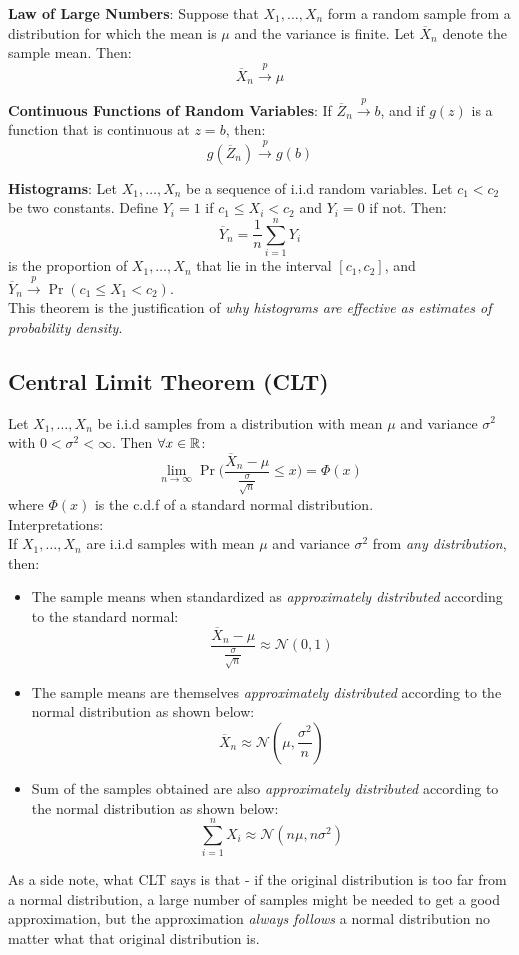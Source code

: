 \documentclass[english, 11pt]{article}
\begin{document}
{\bf Law of Large Numbers}:  Suppose that $X_1, \ldots, X_n$ form a random sample from a distribution for which the mean is $\mu$ and the variance is finite. Let $\overline{X}_n$ denote the sample mean. Then:
\[ \overline{X}_n \xrightarrow{p} \mu \]

{\bf Continuous Functions of Random Variables}: If $\overline{Z}_n \xrightarrow{p} b$, and if $g(z)$ is a function that is continuous at $z=b$, then:
\[ g(\overline{Z}_n) \xrightarrow{p} g(b) \]

{\bf Histograms}: Let $X_1, \ldots, X_n$ be a sequence of i.i.d random variables. Let $c_1 < c_2$ be two constants. Define $Y_i = 1$ if $c_1 \le X_i < c_2$ and $Y_i = 0$ if not. Then:
\[ \overline{Y}_n = \frac{1}{n} \sum_{i=1}^n Y_i \] is the proportion of $X_1, \ldots, X_n$ that lie in the interval $[c_1, c_2]$, and $\overline{Y}_n \xrightarrow{p} \Pr(c_1 \le X_1 < c_2)$. \\
This theorem is the justification of {\it why histograms are effective as estimates of probability density}.

\subsection{Central Limit Theorem (CLT) }
Let $X_1, \ldots, X_n$ be i.i.d samples from a distribution with mean $\mu$ and variance $\sigma^2$ with $0 < \sigma^2 < \infty$. Then $\forall x \in {\mathbb{R}}$:
\[ \lim_{n \to \infty} \Pr \bigg( \frac{\overline{X}_n - \mu}{\frac{\sigma}{\sqrt{n}}} \le x \bigg) = \Phi(x) \]
where $\Phi(x)$ is the c.d.f of a standard normal distribution.\\

Interpretations:\\
If $X_1, \ldots, X_n$ are i.i.d samples with mean $\mu$ and variance $\sigma^2$ from {\it any distribution}, then:
\begin{itemize}
\item The sample means when standardized as {\it approximately distributed} according to the standard normal:
\[ \frac{\overline{X}_n - \mu}{\frac{\sigma}{\sqrt{n}}} \approx \mathcal{N} (0, 1) \]

\item The sample means are themselves {\it approximately distributed} according to the normal distribution as shown below:
\[ \overline{X}_n \approx \mathcal{N} (\mu, \frac{\sigma^2}{n}) \]

\item Sum of the samples obtained are also {\it approximately distributed} according to the normal distribution as shown below:
\[ \sum_{i=1}^n X_i \approx \mathcal{N} (n \mu, n \sigma^2) \]
\end{itemize}
As a side note, what CLT says is that - if the original distribution is too far from a normal distribution, a large number of samples might be needed to get a good approximation, but the approximation {\it always follows} a normal distribution no matter what that original distribution is.
\end{document}
